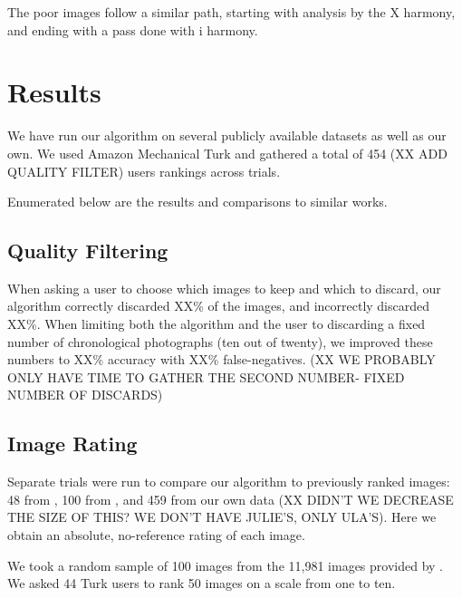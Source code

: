 \documentclass[twocolumn]{article}
\begin{document}
The poor images follow a similar path, starting with analysis by the X harmony, and ending with a pass done with i harmony.

\section{Results}
We have run our algorithm on several publicly available datasets as well as our own. We used Amazon Mechanical Turk and gathered a total of 454 (XX  ADD QUALITY FILTER) users rankings across trials.

Enumerated below are the results and comparisons to similar works.

\subsection{Quality Filtering} When asking a user to choose which images to keep and which to discard, our algorithm correctly discarded XX\% of the images, and incorrectly discarded XX\%. When limiting both the algorithm and the user to discarding a fixed number of chronological photographs (ten out of twenty), we improved these numbers to XX\% accuracy with XX\% false-negatives. (XX WE PROBABLY ONLY HAVE TIME TO GATHER THE SECOND NUMBER- FIXED NUMBER OF DISCARDS)

\subsection{Image Rating} Separate trials were run to compare our algorithm to previously ranked images: 48 from \cite{1640788}, 100 from \cite{springerlink:10.1007/978-3-540-88690-7_29}, and 459 from our own data (XX DIDN'T WE DECREASE THE SIZE OF THIS? WE DON'T HAVE JULIE'S, ONLY ULA'S). Here we obtain an absolute, no-reference rating of each image.

We took a random sample of 100 images from the 11,981 images provided by \cite{springerlink:10.1007/978-3-540-88690-7_29}. We asked 44 Turk users to rank 50 images on a scale from one to ten.
\end{document}
